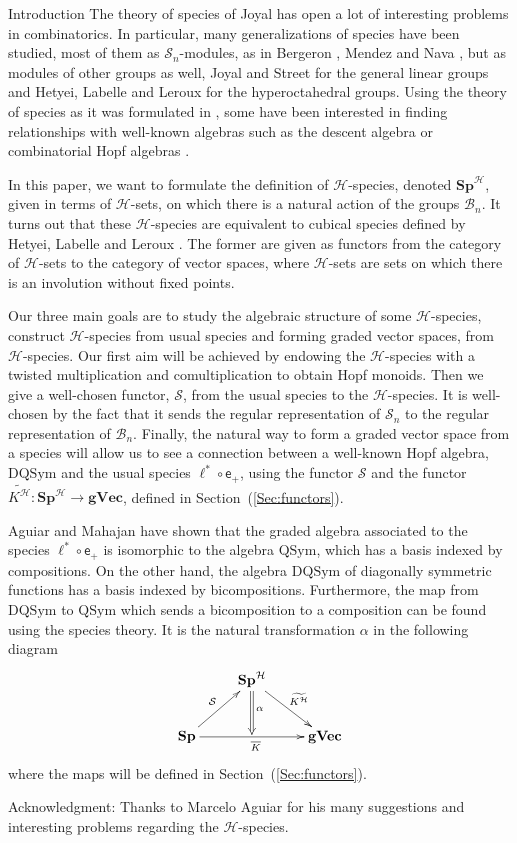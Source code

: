 \documentclass[11pt,reqno]{amsart}
\numberwithin{equation}{section}
\def\S{{\mathbb S}}
\def\Sp{{\mathbf{Sp}}}
\def\SpB{{\mathbf{Sp}^{\H}}}
\def\gVec{{\mathbf{gVec}}}
\def\H{{\mathcal{H}}}
\def\exp{{\textsf{e}}}
\def\S{{\mathcal{S}}}
\def\Kb{\overline{K}}
\def\KBt{\widetilde{K^{\H}}}
\def\Sn{\mathbf{\mathcal{S}}_n}
\def\Bn{\mathcal{B}_n}
\def\QSym{\mathrm{QSym}}
\def\DQSym{\mathrm{DQSym}}
\begin{document}
\begin{section}{Introduction}
The theory of species of Joyal \cite{Joyal} has open a lot of interesting problems in combinatorics. In particular, many generalizations of species have been studied, most of them as $\Sn$-modules, as in Bergeron \cite{Bergeron}, Mendez and Nava \cite{Mendez}, but as modules of other groups as well, Joyal and Street \cite{JoyalStreet} for the general linear groups and Hetyei, Labelle and Leroux \cite{HLL} for the hyperoctahedral groups. Using the theory of species as it was formulated in \cite{Joyal}, some have been interested in finding relationships with well-known algebras such as the descent algebra \cite{PR} or combinatorial Hopf algebras \cite{Aguiar}.

In this paper, we want to formulate the definition of $\H$-species, denoted $\SpB$, given in terms of $\H$-sets, on which there is a natural action of the groups $\Bn$. It turns out that these $\H$-species are equivalent to cubical species defined by Hetyei, Labelle and Leroux \cite{HLL}. The former are given as functors from the category of $\H$-sets to the category of vector spaces, where $\H$-sets are sets on which there is an involution without fixed points. 

Our three main goals are to study the algebraic structure of some $\H$-species, construct $\H$-species from usual species and forming graded vector spaces, from $\H$-species. Our first aim will be achieved by endowing the $\H$-species with a twisted multiplication and comultiplication to obtain Hopf monoids. Then we give a well-chosen functor, $\S$, from the usual species to the $\H$-species. It is well-chosen by the fact that it sends the regular representation of $\Sn$ to the regular representation of $\Bn$. Finally, the natural way to form a graded vector space from a species will allow us to see a connection between a well-known Hopf algebra, $\DQSym$ and the usual species $\ell^*\circ \exp_+$, using the functor $\S$ and the functor $\KBt\colon\SpB\rightarrow \gVec$, defined in Section~(\ref{Sec:functors}).

Aguiar and Mahajan \cite{Aguiar} have shown that the graded algebra associated to the species $\ell^*\circ \exp_+$ is isomorphic to the algebra $\QSym$, which has a basis indexed by compositions. On the other hand, the algebra $\DQSym$ of diagonally symmetric functions has a basis indexed by bicompositions. Furthermore, the map from $\DQSym$ to $\QSym$ which sends a bicomposition to a composition can be found using the species theory. It is the natural transformation $\alpha$ in the following diagram 
\begin{equation}\label{Diag:KBt}
\xymatrix{ & \SpB \ar[dr]^{\KBt} \ar@{=>}[d]^{\alpha} \\ \Sp \ar[rr]_{\Kb} \ar[ur]^{\S} & & \gVec}
\end{equation}
where the maps will be defined in Section~(\ref{Sec:functors}). 



Acknowledgment: Thanks to Marcelo Aguiar for his many suggestions and interesting problems regarding the $\H$-species.

\end{section}
\end{document}
